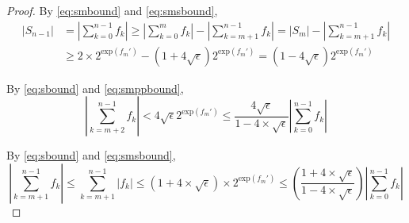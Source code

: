 \documentclass[12pt]{article}
\providecommand{\exp}{\ensuremath{\text{exp}}}
\theoremstyle{definition}
\numberwithin{equation}{section}
\numberwithin{figure}{section}
\begin{document}
\begin{proof}
      By  \eqref{eq:smbound} and \eqref{eq:smsbound},
      \begin{align}
        |S_{n-1}| & = |\sum\limits_{k = 0}^{n - 1} f_k| \geq |\sum\limits_{k = 0}^{m} f_k| - |\sum\limits_{k = m + 1}^{n - 1} f_k| = |S_m| - |\sum\limits_{k = m + 1}^{n - 1} f_k| \nonumber \\
        & \geq 2 \times 2^{\exp(f_{m}')} - (1 + 4 \sqrt\epsilon) 2^{\exp(f_m')} = (1 - 4 \sqrt\epsilon) 2^{\exp(f_m')}
        \label{eq:sbound}
      \end{align}

      By  \eqref{eq:sbound} and \eqref{eq:smppbound},
      \begin{equation}
        |\sum \limits_{k = m + 2}^{n - 1} f_k| < 4 \sqrt{\epsilon} 2^{\exp(f_m')} \leq \frac{4 \sqrt\epsilon}{1 - 4 \times \sqrt\epsilon}|\sum\limits_{k = 0}^{n - 1}f_k|
        \label{eq:smpprelsbound}
      \end{equation}

      By  \eqref{eq:sbound} and \eqref{eq:smsbound},
      \begin{equation}
        |\sum\limits_{k = m + 1}^{n - 1}f_k| \leq \sum\limits_{k = m + 1}^{n - 1}|f_k| \leq (1 + 4 \times \sqrt\epsilon)\times2^{\exp(f_m')}\leq (\frac{1 + 4 \times \sqrt\epsilon}{1 - 4 \times \sqrt\epsilon})|\sum\limits_{k = 0}^{n - 1}f_k|
        \label{eq:smsrelsbound}
      \end{equation}


\end{proof}
\end{document}
